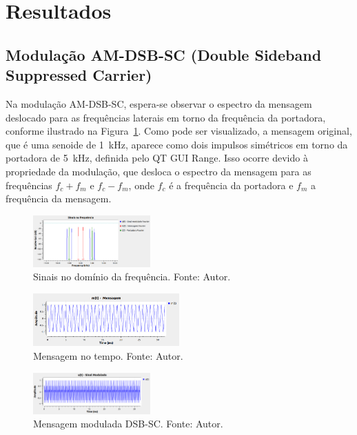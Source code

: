 \section{Resultados}

\subsection{Modulação AM-DSB-SC (Double Sideband Suppressed Carrier)}

Na modulação AM-DSB-SC, espera-se observar o espectro da mensagem deslocado para as frequências laterais em torno da frequência da portadora, conforme ilustrado na Figura~\ref{fig:sinais_freq_am_dsb}. Como pode ser visualizado, a mensagem original, que é uma senoide de 1~kHz, aparece como dois impulsos simétricos em torno da portadora de 5~kHz, definida pelo QT GUI Range. Isso ocorre devido à propriedade da modulação, que desloca o espectro da mensagem para as frequências $f_c + f_m$ e $f_c - f_m$, onde $f_c$ é a frequência da portadora e $f_m$ a frequência da mensagem.

\begin{figure}[!htpb]
    \centering
    \includegraphics[width=0.4\textwidth]{images/sinais_freqe_gnu.png}
    \caption{Sinais no domínio da frequência. Fonte: Autor.}
    \label{fig:sinais_freq_am_dsb}
\end{figure}

\begin{figure}[!htpb]
    \centering
    \includegraphics[width=0.5\textwidth]{images/mensagem_dsb.png}
    \caption{Mensagem no tempo. Fonte: Autor.}
    \label{fig:mensagem_tempo_am_dsb}
\end{figure}

\begin{figure}[h]
    \centering
    \includegraphics[width=0.4\textwidth]{images/mensagem_modulada_gnu.png}
    \caption{Mensagem modulada DSB-SC. Fonte: Autor.}
    \label{fig:mensagem_modulada_am_dsb}
\end{figure}

